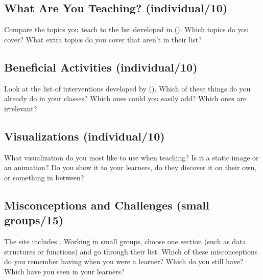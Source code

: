\subsection*{What Are You Teaching? (individual/10)}

Compare the topics you teach to the list developed in \cite{Luxt2017}
(). Which topics do you cover? What extra topics
do you cover that aren't in their list?

\subsection*{Beneficial Activities (individual/10)}

Look at the list of interventions developed by \cite{Viha2014}
(). Which of these things do you already do in
your classes? Which ones could you easily add? Which ones are
irrelevant?

\subsection*{Visualizations (individual/10)}

What visualization do you most like to use when teaching? Is it a static
image or an animation? Do you show it to your learners, do they discover
it on their own, or something in between?

\subsection*{Misconceptions and Challenges (small groups/15)}

The  site
includes . Working in small groups, choose one
section (such as data structures or functions) and go through their
list. Which of these misconceptions do you remember having when you
were a learner? Which do you still have? Which have you seen in your
learners?
